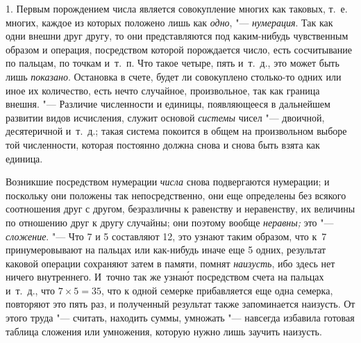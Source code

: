 1. Первым порождением числа является совокупление многих как таковых, т.~е.
многих, каждое из которых положено лишь как {\em одно}, "--- {\em нумерация}.
Так как одни внешни друг другу, то они представляются под каким-нибудь
чувственным образом и операция, посредством которой порождается число, есть
сосчитывание по пальцам, по точкам и~т.~п. Что такое четыре, пять и~т.~д., это
может быть лишь {\em показано}. Остановка в счете, будет ли совокуплено
столько-то одних или иное их количество, есть нечто случайное, произвольное,
так как граница внешня. "--- Различие численности и единицы, появляющееся в
дальнейшем развитии видов исчисления, служит основой {\em системы} чисел "---
двоичной, десятеричной и~т.~д.; такая система покоится в общем на произвольном
выборе той численности, которая постоянно должна снова и снова быть взята как
единица.

Возникшие посредством нумерации {\em числа} снова подвергаются нумерации; и
поскольку они положены так непосредственно, они еще определены без всякого
соотношения друг с другом, безразличны к равенству и неравенству, их величины
по отношению друг к другу случайны; они поэтому вообще {\em неравны;} это "---
{\em сложение}. "--- Что 7 и 5 составляют 12, это узнают таким образом, что к~7
принумеровывают на пальцах или как-нибудь иначе еще 5 одних, результат каковой
операции сохраняют затем в памяти, помнят {\em наизусть}, ибо здесь нет ничего
внутреннего. И~точно так же узна\'{ю}т посредством счета на пальцах и~т.~д.,
что $7\times 5=35$, что к одной семерке прибавляется еще одна семерка,
повторяют это пять раз, и полученный результат также запоминается наизусть. От
этого труда "--- считать, находить суммы, умножать "--- навсегда избавила
готовая таблица сложения или умножения, которую нужно лишь заучить наизусть.

